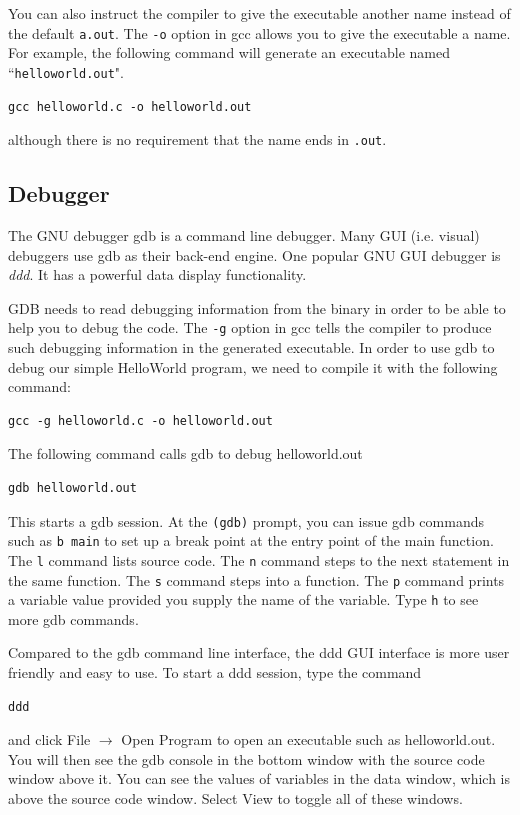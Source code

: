 You can also instruct the compiler to give the executable another name instead of the default \verb+a.out+. The \verb+-o+ option in gcc allows you to give the executable a name. For example, the following command will generate an executable named ``\verb+helloworld.out+".
\begin{lstlisting}[style=bash]
gcc helloworld.c -o helloworld.out
\end{lstlisting}
although there is no requirement that the name ends in \verb+.out+.
\subsection{Debugger}
The GNU debugger gdb is a command line debugger. Many GUI (i.e. visual)  debuggers use gdb as their back-end engine. One popular GNU GUI debugger is {\em ddd}. It has a powerful data display functionality. 

GDB needs to read debugging information from the binary in order to be able to help you to debug the code. The \verb+-g+ option in gcc tells the compiler to produce such debugging information in the generated executable. In order to use gdb to debug our simple HelloWorld program, we need to compile it with the following command:
\begin{lstlisting}[style=bash]
gcc -g helloworld.c -o helloworld.out
\end{lstlisting}

The following command calls gdb to debug helloworld.out 
\begin{lstlisting}[style=bash]
gdb helloworld.out 
\end{lstlisting}
This starts a gdb session. At the \verb+(gdb)+ prompt, you can issue gdb commands such as \verb+b main+ to set up a break point at the entry point of the main function. The \verb+l+ command lists source code. The \verb+n+ command steps to the next statement in the same function. The \verb+s+ command steps into a function. The \verb+p+ command prints a variable value provided you supply the name of the variable. Type \verb+h+ to see more gdb commands.


Compared to the gdb command line interface, the ddd GUI interface is more user friendly and easy to use. To start a ddd session,
type the command
\begin{lstlisting}[style=bash]
ddd 
\end{lstlisting}
and click File $\rightarrow$ Open Program to open an executable such as helloworld.out. You will then see the gdb console in the bottom window with the source code window above it. You can see the values of variables in the data window, which is above the source code window. Select View to toggle all of these windows. 

